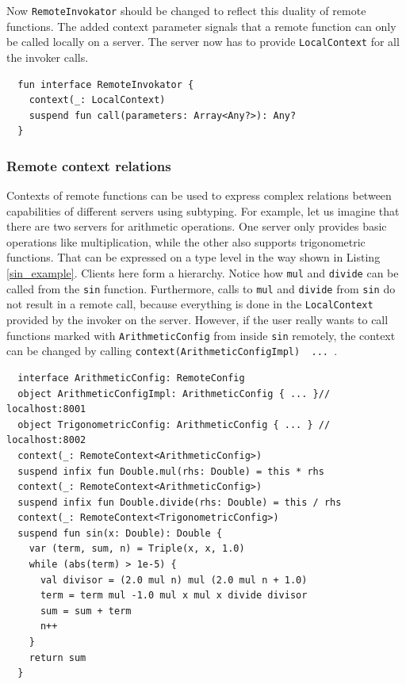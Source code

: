 \documentclass[a4paper,11pt,oneside]{article}
\newcommand{\kotlini}[1]{\texttt{#1}}
\begin{document}
Now \kotlini{RemoteInvokator} should be changed to reflect this duality of remote functions.
The added context parameter signals that a remote function can only be called locally on a server. The
server now has to provide \kotlini{LocalContext} for all the invoker calls. 

\begin{listing}[!h]
  \begin{verbatim}
  fun interface RemoteInvokator {
    context(_: LocalContext)
    suspend fun call(parameters: Array<Any?>): Any?
  }
  \end{verbatim}
  \caption{Updated RemoteInvokator}\label{updated_remote_invokator}
\end{listing}

\subsubsection{Remote context relations}

Contexts of remote functions can be used to express complex relations between capabilities of
different servers using subtyping. For example, let us imagine that there are two servers for
arithmetic operations. One server only provides basic operations like multiplication, while the
other also supports trigonometric functions. That can be expressed on a type level in the way shown
in Listing \ref{sin_example}. Clients here form a hierarchy. Notice how \kotlini{mul} and \kotlini{divide} can be called from
the \kotlini{sin} function. Furthermore, calls to \kotlini{mul} and \kotlini{divide} from
\kotlini{sin} do not result in a remote call, because everything is done in the
\kotlini{LocalContext} provided by the invoker on the server. However, if the user really wants to call
functions marked with \kotlini{ArithmeticConfig} from inside \kotlini{sin} remotely, the
context can be changed by calling \kotlini{context(ArithmeticConfigImpl) { ... }}.

\begin{listing}[!h]
  \begin{verbatim}
  interface ArithmeticConfig: RemoteConfig
  object ArithmeticConfigImpl: ArithmeticConfig { ... }// localhost:8001
  object TrigonometricConfig: ArithmeticConfig { ... } // localhost:8002
  context(_: RemoteContext<ArithmeticConfig>)
  suspend infix fun Double.mul(rhs: Double) = this * rhs
  context(_: RemoteContext<ArithmeticConfig>)
  suspend infix fun Double.divide(rhs: Double) = this / rhs
  context(_: RemoteContext<TrigonometricConfig>)
  suspend fun sin(x: Double): Double {
    var (term, sum, n) = Triple(x, x, 1.0)
    while (abs(term) > 1e-5) {
      val divisor = (2.0 mul n) mul (2.0 mul n + 1.0)
      term = term mul -1.0 mul x mul x divide divisor
      sum = sum + term
      n++
    }
    return sum
  }
  \end{verbatim}
  \caption{Hierarchy of clients}\label{sin_example}
\end{listing}
\end{document}

